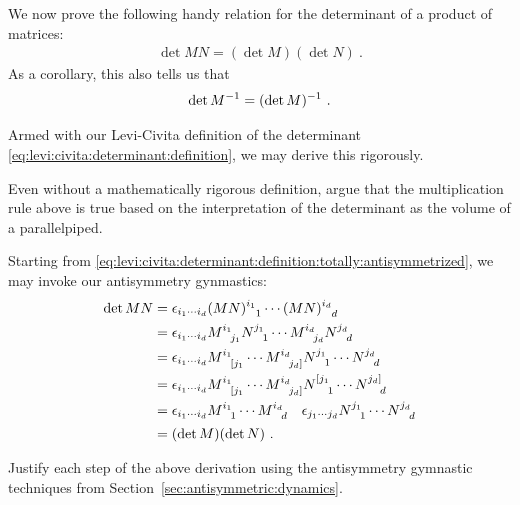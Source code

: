 We now prove the following handy relation for the determinant of a product of matrices:
\begin{align}
    \det MN = (\det M)(\det N) \ .
    \label{eq:det:product:rule}
\end{align}
As a corollary, this also tells us that
\begin{align}
    \det M^{-1} = (\det M)^{-1} \ .
\end{align}

Armed with our Levi-Civita definition of the determinant \eqref{eq:levi:civita:determinant:definition}, we may derive this rigorously.
\begin{exercise}
Even without a mathematically rigorous definition, argue that the multiplication rule above is true based on the interpretation of the determinant as the volume of a parallelpiped. 
\end{exercise}
Starting from \eqref{eq:levi:civita:determinant:definition:totally:antisymmetrized}, we may invoke our antisymmetry gynmastics:
\begin{align}
    \det MN &= 
    \epsilon_{i_1 \cdots i_d}
    (MN)\aij{i_1}{1}\cdots (MN)\aij{i_d}{d} 
    \\
    &= 
    \epsilon_{i_1 \cdots i_d}
    M\aij{i_1}{j_1}N\aij{j_1}{1}
    \cdots 
    M\aij{i_d}{j_d}N\aij{j_d}{d}
    \\
    &= 
    \epsilon_{i_1 \cdots i_d}
    M\aij{i_1}{[j_1}
    \cdots 
    M\aij{i_d}{j_d]}
    N\aij{j_1}{1}
    \cdots
    N\aij{j_d}{d}
    \\
    &= 
    \epsilon_{i_1 \cdots i_d}
    M\aij{i_1}{[j_1}
    \cdots 
    M\aij{i_d}{j_d]}
    N\aij{[j_1}{1}
    \cdots
    N\aij{j_d]}{d}
    \\
    &= 
    \epsilon_{i_1 \cdots i_d}
    M\aij{i_1}{1}
    \cdots 
    M\aij{i_d}{d}\quad
    \epsilon_{j_1 \cdots j_d}
    N\aij{j_1}{1}
    \cdots
    N\aij{j_d}{d}
    \\
    &= 
    (\det M)
    (\det N)
    \ .
\end{align}
\begin{exercise}
Justify each step of the above derivation using the antisymmetry gymnastic techniques from Section~\ref{sec:antisymmetric:dynamics}.
\end{exercise}

